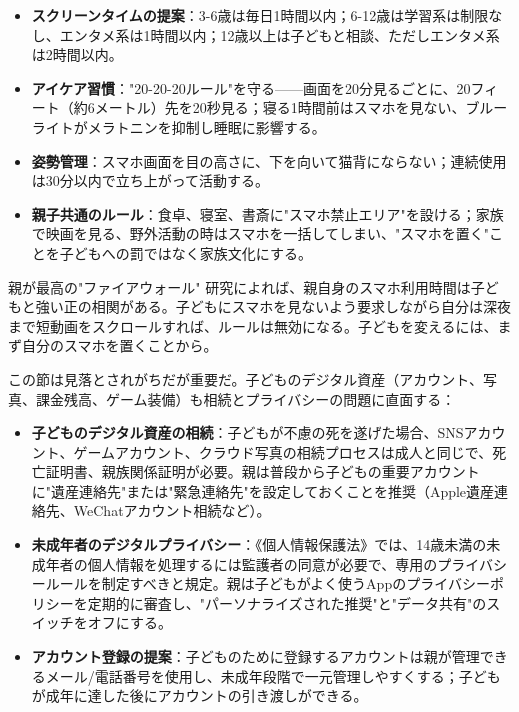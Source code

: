 \begin{itemize}
  \item \textbf{スクリーンタイムの提案}：3-6歳は毎日1時間以内；6-12歳は学習系は制限なし、エンタメ系は1時間以内；12歳以上は子どもと相談、ただしエンタメ系は2時間以内。
  \item \textbf{アイケア習慣}："20-20-20ルール"を守る——画面を20分見るごとに、20フィート（約6メートル）先を20秒見る；寝る1時間前はスマホを見ない、ブルーライトがメラトニンを抑制し睡眠に影響する。
  \item \textbf{姿勢管理}：スマホ画面を目の高さに、下を向いて猫背にならない；連続使用は30分以内で立ち上がって活動する。
  \item \textbf{親子共通のルール}：食卓、寝室、書斎に"スマホ禁止エリア"を設ける；家族で映画を見る、野外活動の時はスマホを一括してしまい、"スマホを置く"ことを子どもへの罰ではなく家族文化にする。
\end{itemize}

\begin{tcbinfo}{親が最高の"ファイアウォール"}
研究によれば、親自身のスマホ利用時間は子どもと強い正の相関がある。子どもにスマホを見ないよう要求しながら自分は深夜まで短動画をスクロールすれば、ルールは無効になる。子どもを変えるには、まず自分のスマホを置くことから。

\end{tcbinfo}


この節は見落とされがちだが重要だ。子どものデジタル資産（アカウント、写真、課金残高、ゲーム装備）も相続とプライバシーの問題に直面する：

\begin{itemize}
  \item \textbf{子どものデジタル資産の相続}：子どもが不慮の死を遂げた場合、SNSアカウント、ゲームアカウント、クラウド写真の相続プロセスは成人と同じで、死亡証明書、親族関係証明が必要。親は普段から子どもの重要アカウントに"遺産連絡先"または"緊急連絡先"を設定しておくことを推奨（Apple遺産連絡先、WeChatアカウント相続など）。
  \item \textbf{未成年者のデジタルプライバシー}：《個人情報保護法》では、14歳未満の未成年者の個人情報を処理するには監護者の同意が必要で、専用のプライバシールールを制定すべきと規定。親は子どもがよく使うAppのプライバシーポリシーを定期的に審査し、"パーソナライズされた推奨"と"データ共有"のスイッチをオフにする。
  \item \textbf{アカウント登録の提案}：子どものために登録するアカウントは親が管理できるメール/電話番号を使用し、未成年段階で一元管理しやすくする；子どもが成年に達した後にアカウントの引き渡しができる。
\end{itemize}


